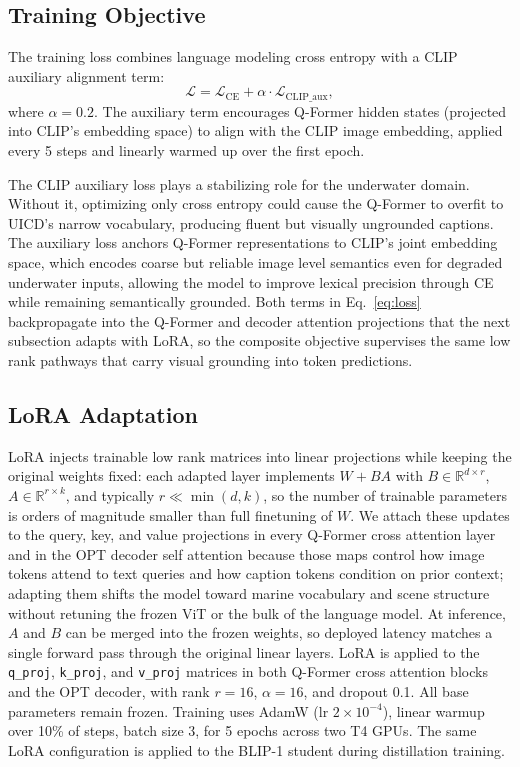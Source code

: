 \documentclass[journal]{IEEEtran}
\begin{document}
\subsection{Training Objective}
The training loss combines language modeling cross entropy with a CLIP auxiliary alignment term:
\begin{equation}
  \mathcal{L} = \mathcal{L}_{\mathrm{CE}} + \alpha \cdot \mathcal{L}_{\mathrm{CLIP\_aux}},
  \label{eq:loss}
\end{equation}
where $\alpha = 0.2$. The auxiliary term encourages Q-Former hidden states (projected into CLIP's embedding space) to align with the CLIP image embedding, applied every 5 steps and linearly warmed up over the first epoch.

The CLIP auxiliary loss plays a stabilizing role for the underwater domain. Without it, optimizing only cross entropy could cause the Q-Former to overfit to UICD's narrow vocabulary, producing fluent but visually ungrounded captions. The auxiliary loss anchors Q-Former representations to CLIP's joint embedding space, which encodes coarse but reliable image level semantics even for degraded underwater inputs, allowing the model to improve lexical precision through CE while remaining semantically grounded.
Both terms in Eq.~\ref{eq:loss} backpropagate into the Q-Former and decoder attention projections that the next subsection adapts with LoRA, so the composite objective supervises the same low rank pathways that carry visual grounding into token predictions.

\subsection{LoRA Adaptation}
LoRA injects trainable low rank matrices into linear projections while keeping the original weights fixed: each adapted layer implements $W + BA$ with $B \in \mathbb{R}^{d \times r}$, $A \in \mathbb{R}^{r \times k}$, and typically $r \ll \min(d,k)$, so the number of trainable parameters is orders of magnitude smaller than full finetuning of $W$.
We attach these updates to the query, key, and value projections in every Q-Former cross attention layer and in the OPT decoder self attention because those maps control how image tokens attend to text queries and how caption tokens condition on prior context; adapting them shifts the model toward marine vocabulary and scene structure without retuning the frozen ViT or the bulk of the language model.
At inference, $A$ and $B$ can be merged into the frozen weights, so deployed latency matches a single forward pass through the original linear layers.
LoRA is applied to the \texttt{q\_proj}, \texttt{k\_proj}, and \texttt{v\_proj} matrices in both Q-Former cross attention blocks and the OPT decoder, with rank $r=16$, $\alpha=16$, and dropout 0.1. All base parameters remain frozen. Training uses AdamW (lr $2\times10^{-4}$), linear warmup over 10\% of steps, batch size 3, for 5 epochs across two T4 GPUs. The same LoRA configuration is applied to the BLIP-1 student during distillation training.
\end{document}
